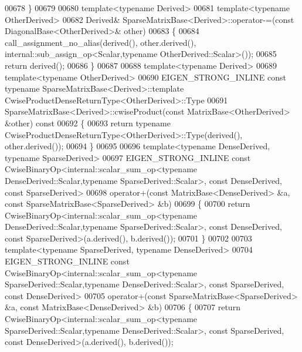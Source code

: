 \begin{DoxyCode}
00678 \}
00679 
00680 \textcolor{keyword}{template}<\textcolor{keyword}{typename} Derived>
00681 \textcolor{keyword}{template}<\textcolor{keyword}{typename} OtherDerived>
00682 Derived& SparseMatrixBase<Derived>::operator-=(\textcolor{keyword}{const} DiagonalBase<OtherDerived>& other)
00683 \{
00684   call\_assignment\_no\_alias(derived(), other.derived(), internal::sub\_assign\_op<Scalar,typename
       OtherDerived::Scalar>());
00685   \textcolor{keywordflow}{return} derived();
00686 \}
00687     
00688 \textcolor{keyword}{template}<\textcolor{keyword}{typename} Derived>
00689 \textcolor{keyword}{template}<\textcolor{keyword}{typename} OtherDerived>
00690 EIGEN\_STRONG\_INLINE \textcolor{keyword}{const} \textcolor{keyword}{typename} SparseMatrixBase<Derived>::template 
      CwiseProductDenseReturnType<OtherDerived>::Type
00691 SparseMatrixBase<Derived>::cwiseProduct(\textcolor{keyword}{const} MatrixBase<OtherDerived> &other)\textcolor{keyword}{ const}
00692 \textcolor{keyword}{}\{
00693   \textcolor{keywordflow}{return} \textcolor{keyword}{typename} CwiseProductDenseReturnType<OtherDerived>::Type(derived(), other.derived());
00694 \}
00695 
00696 \textcolor{keyword}{template}<\textcolor{keyword}{typename} DenseDerived, \textcolor{keyword}{typename} SparseDerived>
00697 EIGEN\_STRONG\_INLINE \textcolor{keyword}{const} CwiseBinaryOp<internal::scalar\_sum\_op<typename DenseDerived::Scalar,typename
       SparseDerived::Scalar>, \textcolor{keyword}{const} DenseDerived, \textcolor{keyword}{const} SparseDerived>
00698 operator+(\textcolor{keyword}{const} MatrixBase<DenseDerived> &a, \textcolor{keyword}{const} SparseMatrixBase<SparseDerived> &b)
00699 \{
00700   \textcolor{keywordflow}{return} CwiseBinaryOp<internal::scalar\_sum\_op<typename DenseDerived::Scalar,typename
       SparseDerived::Scalar>, \textcolor{keyword}{const} DenseDerived, \textcolor{keyword}{const} SparseDerived>(a.derived(), b.derived());
00701 \}
00702 
00703 \textcolor{keyword}{template}<\textcolor{keyword}{typename} SparseDerived, \textcolor{keyword}{typename} DenseDerived>
00704 EIGEN\_STRONG\_INLINE \textcolor{keyword}{const} CwiseBinaryOp<internal::scalar\_sum\_op<typename SparseDerived::Scalar,typename
       DenseDerived::Scalar>, \textcolor{keyword}{const} SparseDerived, \textcolor{keyword}{const} DenseDerived>
00705 operator+(\textcolor{keyword}{const} SparseMatrixBase<SparseDerived> &a, \textcolor{keyword}{const} MatrixBase<DenseDerived> &b)
00706 \{
00707   \textcolor{keywordflow}{return} CwiseBinaryOp<internal::scalar\_sum\_op<typename SparseDerived::Scalar,typename
       DenseDerived::Scalar>, \textcolor{keyword}{const} SparseDerived, \textcolor{keyword}{const} DenseDerived>(a.derived(), b.derived());

\end{DoxyCode}
